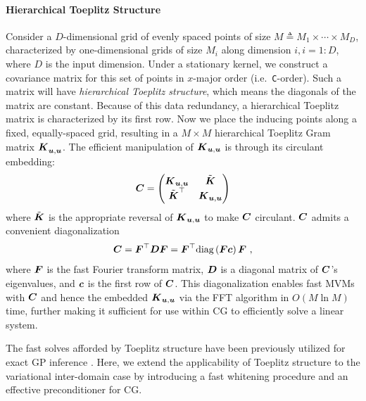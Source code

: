 \paragraph{Hierarchical Toeplitz Structure}
\label{sec:toeplitz-structure}
Consider a $D$-dimensional grid of evenly spaced points
of size $M \triangleq M_1 \times \cdots \times M_D$, characterized by
one-dimensional grids of size $M_i$ along dimension $i, i=1:D$,
where $D$ is the input dimension.
Under a stationary kernel, we construct a covariance matrix
for this set of points in $x$-major
order (i.e.~\texttt{C}-order).
Such a matrix will have \emph{hierarchical Toeplitz structure},
which means the diagonals of the matrix are constant.
Because of this data redundancy, a hierarchical Toeplitz matrix
is characterized by its first row.
Now we place the inducing points along
a fixed, equally-spaced grid, resulting in a $M \times M$ hierarchical
Toeplitz Gram matrix $\boldsymbol{K}^{}_{\boldsymbol{u},\boldsymbol{u}}$.
The efficient manipulation of $\boldsymbol{K}_{\boldsymbol{u}, \boldsymbol{u}}$ is through its circulant embedding:
\begin{align}
    \boldsymbol{C} =
    \begin{pmatrix}
    \boldsymbol{K}_{\boldsymbol{u}, \boldsymbol{u}} & \tilde{\boldsymbol{K}} \\
    \tilde{\boldsymbol{K}}^\top & \boldsymbol{K}_{\boldsymbol{u}, \boldsymbol{u}}
    \end{pmatrix}
\end{align}
where $\tilde{\boldsymbol{K}}$ is the appropriate reversal of $\boldsymbol{K}_{\boldsymbol{u}, \boldsymbol{u}}$ to make $\boldsymbol{C}$ circulant.
$\boldsymbol{C}$ admits a convenient diagonalization
\begin{align}
  \boldsymbol{C} = \boldsymbol{F}^\top \boldsymbol{D} \boldsymbol{F}
      = \boldsymbol{F}^\top \text{diag} \left(\boldsymbol{F} \boldsymbol{c} \right) \boldsymbol{F} \,\,,
\end{align}
where $\boldsymbol{F}$ is the fast Fourier transform matrix, $\boldsymbol{D}$ is a
diagonal matrix of $\boldsymbol{C}$'s eigenvalues, and $\boldsymbol{c}$ is the first row of $\boldsymbol{C}$.
This diagonalization enables fast MVMs with $\boldsymbol{C}$ and
hence the embedded $\boldsymbol{K}_{\boldsymbol{u}, \boldsymbol{u}}$ via the FFT algorithm
in $O(M \ln M)$ time, further making it sufficient for use
within CG to efficiently solve a linear system.

The fast solves afforded by Toeplitz structure have been previously
utilized for exact GP inference \citep{cunningham2008fast, wilson2015thoughts}.
Here, we extend the applicability of Toeplitz structure
to the variational inter-domain case
by introducing a fast whitening procedure and an effective preconditioner for CG.


